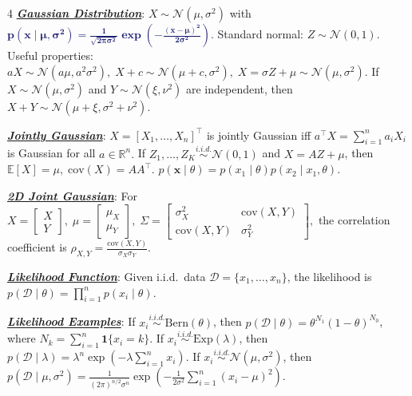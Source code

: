 \documentclass[12pt]{article}
\newcommand{\bulletPoint}[1]{\underline{\textit{\textbf{#1}}}}
\begin{document}
\begin{multicols*}{4}
\bulletPoint{Gaussian Distribution}:
$X\sim \mathcal N(\mu,\sigma^2)$ with
\textcolor{MidnightBlue}{$\bm{p(x\mid \mu,\sigma^2)=
\frac{1}{\sqrt{2\pi\sigma^2}}
\exp\!\left(-\frac{(x-\mu)^2}{2\sigma^2}\right).}$}
Standard normal: $Z\sim \mathcal N(0,1).$
Useful properties:
$aX\sim \mathcal N(a\mu,a^2\sigma^2),\;
X+c\sim \mathcal N(\mu+c,\sigma^2),\;
X=\sigma Z+\mu\sim \mathcal N(\mu,\sigma^2).$
If $X\sim \mathcal N(\mu,\sigma^2)$ and $Y\sim \mathcal N(\xi,\nu^2)$ are independent, then
$X+Y\sim \mathcal N(\mu+\xi,\sigma^2+\nu^2).$

\bulletPoint{Jointly Gaussian}:
$X=[X_1,\dots,X_n]^\top$ is jointly Gaussian iff
$a^\top X=\sum_{i=1}^n a_iX_i$ is Gaussian for all $a\in\mathbb R^n.$
If $Z_1,\dots,Z_K\overset{i.i.d.}{\sim}\mathcal N(0,1)$ and $X=AZ+\mu$, then
$\mathbb E[X]=\mu,\; \mathrm{cov}(X)=AA^\top.$
{\color{blue}
\useshortskip\noindent{}
}
$p(\mathbf{x}\mid\theta)=p(x_1\mid\theta)p(x_2\mid x_1,\theta).$

\bulletPoint{2D Joint Gaussian}:
For
$X=\begin{bmatrix}X\\Y\end{bmatrix},\;
\mu=\begin{bmatrix}\mu_X\\ \mu_Y\end{bmatrix},\;
\Sigma=\begin{bmatrix}
\sigma_X^2 & \mathrm{cov}(X,Y)\\
\mathrm{cov}(X,Y) & \sigma_Y^2
\end{bmatrix},$
the correlation coefficient is
$\rho_{X,Y}=\frac{\mathrm{cov}(X,Y)}{\sigma_X\sigma_Y}.$



\bulletPoint{Likelihood Function}:
Given i.i.d.\ data $\mathcal D=\{x_1,\dots,x_n\}$, the likelihood is
$p(\mathcal D\mid \theta)=\prod_{i=1}^n p(x_i\mid \theta).$

\bulletPoint{Likelihood Examples}:
If $x_i\overset{i.i.d.}{\sim}\mathrm{Bern}(\theta)$, then
$p(\mathcal D\mid \theta)=\theta^{N_1}(1-\theta)^{N_0}$,
where $N_k=\sum_{i=1}^n \mathbf 1\{x_i=k\}.$
If $x_i\overset{i.i.d.}{\sim}\mathrm{Exp}(\lambda)$, then
$p(\mathcal D\mid \lambda)=\lambda^n\exp\!\left(-\lambda\sum_{i=1}^n x_i\right).$
If $x_i\overset{i.i.d.}{\sim}\mathcal N(\mu,\sigma^2)$, then
\textcolor{blue!50!black}{$\textstyle
p(\mathcal D\mid \mu,\sigma^2)=
\frac{1}{(2\pi)^{n/2}\sigma^n}
\exp\!\left(-\frac{1}{2\sigma^2}\sum_{i=1}^n (x_i-\mu)^2\right).
$}


\end{multicols*}
\end{document}
